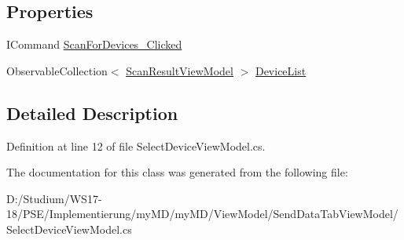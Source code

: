 \subsection*{Properties}
\begin{CompactItemize}
\item 
\hypertarget{classmy_m_d_1_1_view_model_1_1_send_data_tab_view_model_1_1_select_device_view_model_f80fb5b69a7fa6cf57651edbf249525b}{
ICommand \hyperlink{classmy_m_d_1_1_view_model_1_1_send_data_tab_view_model_1_1_select_device_view_model_f80fb5b69a7fa6cf57651edbf249525b}{Scan\-For\-Devices\_\-Clicked}}
\label{d9/d00/classmy_m_d_1_1_view_model_1_1_send_data_tab_view_model_1_1_select_device_view_model_f80fb5b69a7fa6cf57651edbf249525b}

\item 
\hypertarget{classmy_m_d_1_1_view_model_1_1_send_data_tab_view_model_1_1_select_device_view_model_1f9fa18faae0281e801021a2ff0cad70}{
Observable\-Collection$<$ \hyperlink{classmy_m_d_1_1_view_model_1_1_send_data_tab_view_model_1_1_scan_result_view_model}{Scan\-Result\-View\-Model} $>$ \hyperlink{classmy_m_d_1_1_view_model_1_1_send_data_tab_view_model_1_1_select_device_view_model_1f9fa18faae0281e801021a2ff0cad70}{Device\-List}}
\label{d9/d00/classmy_m_d_1_1_view_model_1_1_send_data_tab_view_model_1_1_select_device_view_model_1f9fa18faae0281e801021a2ff0cad70}

\end{CompactItemize}


\subsection{Detailed Description}




Definition at line 12 of file Select\-Device\-View\-Model.cs.

The documentation for this class was generated from the following file:\begin{CompactItemize}
\item 
D:/Studium/WS17-18/PSE/Implementierung/my\-MD/my\-MD/View\-Model/Send\-Data\-Tab\-View\-Model/Select\-Device\-View\-Model.cs\end{CompactItemize}

